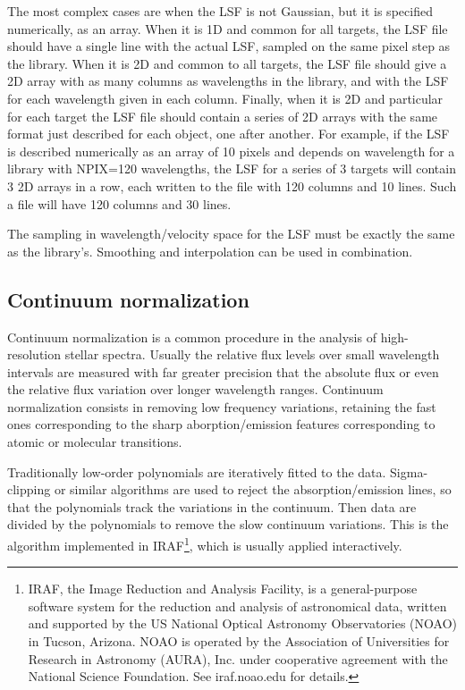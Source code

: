 \documentclass[12pt]{article}
\begin{document}
The most complex cases are when the LSF is not Gaussian, but it is specified numerically,
as an array. When it is 1D and common for all targets, the LSF file should have a single
line with the actual LSF, sampled on the same pixel step as the library. When it is 2D and
common to all targets, the LSF file should give a 2D array with as many columns as wavelengths
in the library, and with the LSF for each wavelength given in each column. Finally, when
it is 2D and particular for each target the LSF file should contain a series of 2D arrays
with the same format just described for each object, one after another. For example, if the
LSF is described numerically as an array of 10 pixels and depends on wavelength for
a library with NPIX=120 wavelengths, the LSF for a series of 3 targets will contain 3
2D arrays in a row, each written to the file with 120 columns and 10 lines. Such a file
will have 120 columns and 30 lines.

The sampling in wavelength/velocity space for the LSF must be exactly the same as 
the library's. Smoothing and interpolation can be used in combination.

\subsection{Continuum normalization}

Continuum normalization is a common procedure in the analysis of high-resolution 
stellar spectra. Usually the relative flux levels over small wavelength intervals 
are measured with far greater precision that the absolute flux or even the
relative flux variation over longer wavelength ranges. Continuum normalization 
consists in removing low frequency variations, retaining the fast ones corresponding
to the sharp aborption/emission features corresponding to atomic or molecular transitions.

Traditionally low-order polynomials are iteratively fitted to the data. Sigma-clipping
or similar algorithms are used to reject the absorption/emission lines, so that the 
polynomials track the variations in the continuum. Then data are divided by the polynomials
to remove the slow continuum variations. This is the algorithm implemented in 
IRAF\footnote{IRAF, the Image Reduction and Analysis Facility, is a general-purpose software 
system for the reduction and analysis of astronomical data, written and supported by the US
National Optical Astronomy Observatories (NOAO) in Tucson, Arizona. NOAO is operated by 
the Association of Universities for Research in Astronomy (AURA), Inc. under 
cooperative agreement with the National Science Foundation. See iraf.noao.edu for details.}, 
which is usually applied interactively.
\end{document}
